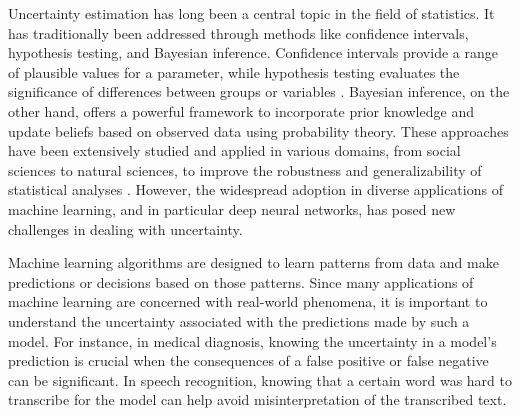 Uncertainty estimation has long been a central topic in the field of statistics. It has traditionally been addressed through methods like confidence intervals, hypothesis testing, and Bayesian inference. Confidence intervals provide a range of plausible values for a parameter, while hypothesis testing evaluates the significance of differences between groups or variables \cite{blitzstein_introduction_2019}. Bayesian inference, on the other hand, offers a powerful framework to incorporate prior knowledge and update beliefs based on observed data using probability theory. These approaches have been extensively studied and applied in various domains, from social sciences to natural sciences, to improve the robustness and generalizability of statistical analyses \cite{gelman_bayesian_2013}. However, the widespread adoption in diverse applications of machine learning, and in particular deep neural networks, has posed new challenges in dealing with uncertainty. 

Machine learning algorithms are designed to learn patterns from data and make predictions or decisions based on those patterns. Since many applications of machine learning are concerned with real-world phenomena, it is important to understand the uncertainty associated with the predictions made by such a model. For instance, in medical diagnosis, knowing the uncertainty in a model's prediction is crucial when the consequences of a false positive or false negative can be significant. In speech recognition, knowing that a certain word was hard to transcribe for the model can help avoid misinterpretation of the transcribed text.






